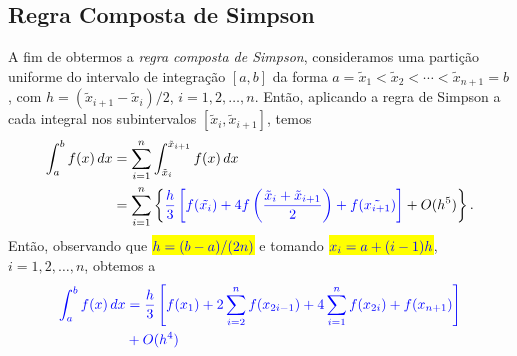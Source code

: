 \subsection{Regra Composta de Simpson}

A fim de obtermos a \emph{regra composta de Simpson}, consideramos uma partição uniforme do intervalo de integração $[a, b]$ da forma $a=\tilde{x}_1 < \tilde{x}_2 < \cdots < \tilde{x}_{n+1}=b$, com $h=(\tilde{x}_{i+1}-\tilde{x}_{i})/2$, $i=1, 2, \dotsc, n$. Então, aplicando a regra de Simpson a cada integral nos subintervalos $[\tilde{x}_i, \tilde{x}_{i+1}]$, temos
\begin{subequations}
  \begin{align}
    \int_a^b f(x)\,dx &= \sum_{i=1}^{n}\int_{\tilde{x}_i}^{\tilde{x}_{i+1}}f(x)\,dx\\
                      &= \sum_{i=1}^n \left\{{\color{blue}\frac{h}{3}\left[f(\tilde{x_i}) + 4f\left(\frac{\tilde{x}_i+\tilde{x}_{i+1}}{2}\right) + f(\tilde{x_{i+1}})\right]} + O(h^5)\right\}.
  \end{align}
\end{subequations}
Então, observando que \hl{$\color{blue}h=(b-a)/(2n)$} e tomando \hl{$\color{blue}x_i=a+(i-1)h$}, $i=1, 2, \dotsc, n$, obtemos a 
\begin{equation}\color{blue}\begin{aligned}
    \int_a^b f(x)\,dx &= \frac{h}{3}\left[f(x_1) + 2\sum_{i=2}^{n} f(x_{2i-1}) + 4\sum_{i=1}^{n} f(x_{2i}) + f(x_{n+1})\right]\\
    &+ O(h^4)
  \end{aligned}
\end{equation}

